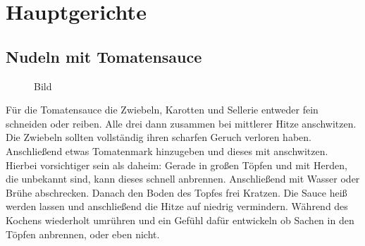\section{Hauptgerichte}\label{sec:hauptgerichte}
\newpage

\subsection{Nudeln mit Tomatensauce}\label{subsec:nudeln-mit-tomatensauce}
\begin{tcolorbox}
    [
    blanker,
    width=0.64\textwidth,enlarge left by=0.36\textwidth,
    before skip=6pt,
    breakable,
    overlay unbroken and first={%
        \node[inner sep=0pt,outer sep=0pt,text width=0.33\textwidth,
            align=none,
            below right]
        at ([xshift=-0.36\textwidth]frame.north west)
            {%
            Rezept von Jakob\\
            Rezept für 10\\
            \begin{flushright}
                \noindent\makebox[\linewidth]{\rule{\linewidth}{0.4pt}}
                \textbf{Tomatensauce}\\
                Zwiebeln\\
                Sellerie\\
                Karotten\\
                Tomatenmark\\
                Tomaten aus der Dose\\
                \textbf{Nudeln}\\
                Nudeln
            \end{flushright}
        };}]
    \begin{figure}[H]
        \begin{center}
            \caption{Bild}
        \end{center}
    \end{figure}
    Für die Tomatensauce die Zwiebeln, Karotten und Sellerie entweder fein schneiden oder reiben.
    Alle drei dann zusammen bei mittlerer Hitze anschwitzen.
    Die Zwiebeln sollten vollständig ihren scharfen Geruch verloren haben.\\
    Anschließend etwas Tomatenmark hinzugeben und dieses mit anschwitzen.
    Hierbei vorsichtiger sein als daheim: Gerade in großen Töpfen und mit Herden, die unbekannt sind, kann dieses schnell anbrennen.
    Anschließend mit Wasser oder Brühe abschrecken.
    Danach den Boden des Topfes frei Kratzen.
    Die Sauce heiß werden lassen und anschließend die Hitze auf niedrig vermindern.
    Während des Kochens wiederholt umrühren und ein Gefühl dafür entwickeln ob Sachen in den Töpfen anbrennen, oder eben nicht.\\


\end{tcolorbox}
